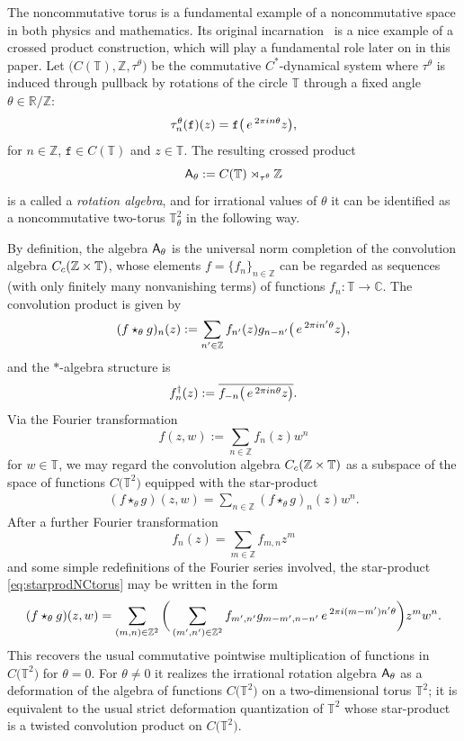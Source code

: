 \documentclass[11pt]{article}
\numberwithin{equation}{section}
\numberwithin{equation}{section}
\newcommand{\Z}{\zed}
\def\ii{{{\rm i}}}
\def\A{{\sf A}}
\newcommand{\complex}{{\mathbb C}} %
\newcommand{\zed}{{\mathbb Z}} %
\newcommand{\real}{{\mathbb R}} %
\newcommand{\torus}{{\mathbb T}} %
\def\e{{\,\rm e}\,}
\begin{document}
\setcounter{Theorem}{0}\setcounter{equation}{1}
\begin{Example}\label{ex:NCtori}
The noncommutative torus is a fundamental example
of a noncommutative space in both physics and mathematics. Its
original incarnation~\cite{Rieffel1981} is a nice example of a crossed
product construction, which will play a fundamental role later on in this
paper. Let $\big(C(\torus),\Z,\tau^\theta\big)$ be the commutative $C^*$-dynamical system
where $\tau^\theta$ is induced through pullback by rotations of the circle $\torus$ through
a fixed angle $\theta\in\real/\Z$:
\[
\tau^\theta_n(\mathtt{f})(z) = \mathtt{f}\big(\e^{2\pi\ii n \theta} z\big) ,
\]
for $n\in\Z$, $\mathtt{f}\in C(\torus)$ and $z\in\torus$. The resulting crossed
product
\[
\A_\theta:=C(\torus)\rtimes_{\tau^\theta}\Z
\]
is a called a \emph{rotation
algebra}, and for irrational values of $\theta$ it can be identified as a noncommutative two-torus
$\torus_\theta^2$ in the following way.

By definition, the algebra
$\A_\theta$ is the universal norm completion of the convolution
algebra $C_{\rm c}(\Z\times\torus)$, whose elements $f=\{f_n\}_{n\in\Z}$ can be regarded as
sequences (with only finitely many nonvanishing
terms) of functions $f_n\colon \torus\to\complex$. The convolution product is
given by
\[
(f\star_\theta g)_n(z) := \sum_{n'\in\Z} f_{n'}(z) g_{n-n'}\big(\e^{2\pi\ii n' \theta} z\big) ,
\]
and the $*$-algebra structure is
\[
f^\dag_n(z):=\overline{f_{-n}\big(\e^{2\pi\ii n \theta} z\big)} .
\]
Via the Fourier transformation
\[
f(z,w) := \sum_{n\in\Z} f_{n}(z) w^n
\]
for $w\in\torus$, we may regard the convolution algebra $C_{\rm
 c}(\Z\times\torus)$ as a subspace of the space of functions $C\big(\torus^2\big)$ equipped
with the star-product
\begin{gather}\label{eq:starprodNCtorus}
(f\star_\theta g)(z,w) = \sum_{n\in\Z} (f\star_\theta g)_n(z) w^n .
\end{gather}
After a further Fourier transformation
\[
f_n(z) = \sum_{m\in\Z} f_{m,n} z^m
\]
and some simple redefinitions of the Fourier series involved, the
star-product \eqref{eq:starprodNCtorus} may be written in the form
\[
(f\star_\theta g)(z,w) = \sum_{(m,n)\in\Z^2}
\bigg(\sum_{(m',n')\in\Z^2} f_{m',n'} g_{m-m',n-n'}
\e^{2\pi\ii (m-m') n' \theta}\bigg) z^m w^n .
\]
This recovers the usual commutative pointwise multiplication of functions in
$C\big(\torus^2\big)$ for $\theta=0$. For $\theta\neq0$ it realizes the irrational rotation algebra $\A_\theta$ as a
deformation of the algebra of functions $C\big(\torus^2\big)$ on a
two-dimensional torus $\torus^2$; it is equivalent to the usual strict
deformation quantization of $\torus^2$ whose star-product is a twisted
convolution product on $C\big(\torus^2\big)$.


\end{Example}
\end{document}
